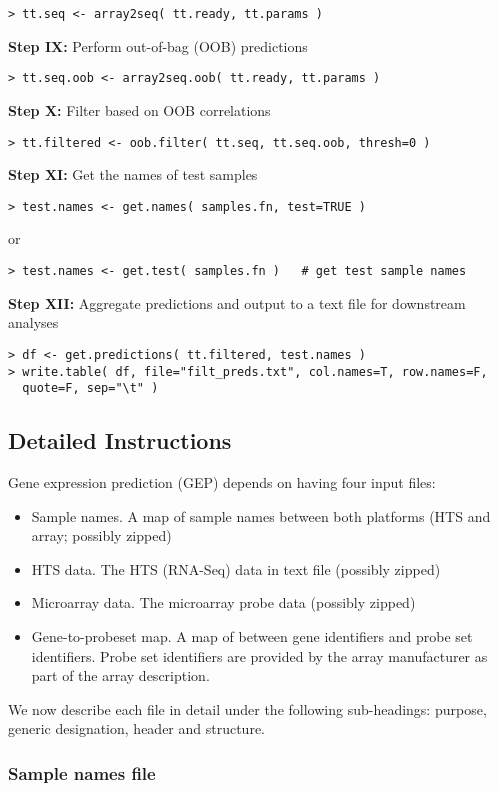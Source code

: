 \documentclass[a4paper,12pt]{article}
\begin{document}
\begin{verbatim}
> tt.seq <- array2seq( tt.ready, tt.params )
\end{verbatim}
\textbf{Step IX:} Perform out-of-bag (OOB) predictions
\begin{verbatim}
> tt.seq.oob <- array2seq.oob( tt.ready, tt.params )
\end{verbatim}
\textbf{Step X:} Filter based on OOB correlations
\begin{verbatim}
> tt.filtered <- oob.filter( tt.seq, tt.seq.oob, thresh=0 )
\end{verbatim}
\textbf{Step XI:} Get the names of test samples
\begin{verbatim}
> test.names <- get.names( samples.fn, test=TRUE )
\end{verbatim}
or 
\begin{verbatim}
> test.names <- get.test( samples.fn )   # get test sample names
\end{verbatim}
\textbf{Step XII:} Aggregate predictions and output to a text file for downstream analyses
\begin{verbatim}
> df <- get.predictions( tt.filtered, test.names )
> write.table( df, file="filt_preds.txt", col.names=T, row.names=F, 
  quote=F, sep="\t" )
\end{verbatim}

\subsection{Detailed Instructions}
Gene expression prediction (GEP) depends on having four input files:
\begin{itemize}
\item Sample names. A map of sample names between both platforms (HTS and array; possibly zipped)
\item HTS data. The HTS (RNA-Seq) data in text file (possibly zipped)
\item Microarray data. The microarray probe data (possibly zipped) 
\item Gene-to-probeset map. A map of between gene identifiers and probe set identifiers. Probe set identifiers are provided by the array manufacturer as part of the array description.
\end{itemize}

We now describe each file in detail under the following sub-headings: purpose, generic designation, header and structure.

\subsubsection{Sample names file}
\end{document}

